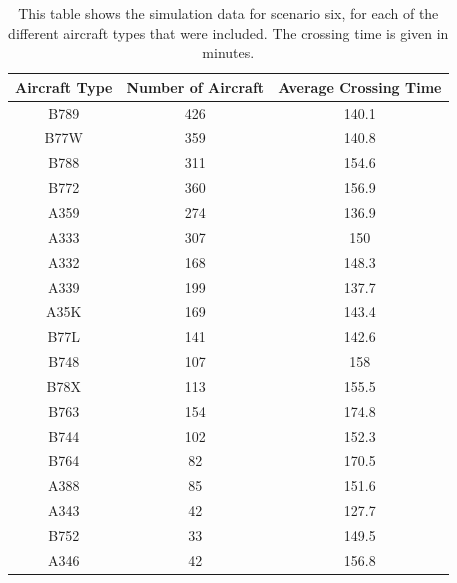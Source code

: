 \documentclass[stu, a4paper, 12pt, floatsintext]{apa7}
\numberwithin{figure}{section}
\numberwithin{table}{section}
\numberwithin{equation}{section}
\begin{document}
\begin{table}[H]
    \centering
    \caption{This table shows the simulation data for scenario six, for each of the different aircraft types that were included. The crossing time is given in minutes.}
    \label{tab:37}
    \begin{tabular}{@{}ccc@{}}
    \toprule
    \textbf{Aircraft Type} & \textbf{Number of Aircraft} & \textbf{Average Crossing Time} \\ \midrule
    B789                   & 426                         & 140.1                          \\
    B77W                   & 359                         & 140.8                          \\
    B788                   & 311                         & 154.6                          \\
    B772                   & 360                         & 156.9                          \\
    A359                   & 274                         & 136.9                          \\
    A333                   & 307                         & 150                            \\
    A332                   & 168                         & 148.3                          \\
    A339                   & 199                         & 137.7                          \\
    A35K                   & 169                         & 143.4                          \\
    B77L                   & 141                         & 142.6                          \\
    B748                   & 107                         & 158                            \\
    B78X                   & 113                         & 155.5                          \\
    B763                   & 154                         & 174.8                          \\
    B744                   & 102                         & 152.3                          \\
    B764                   & 82                          & 170.5                          \\
    A388                   & 85                          & 151.6                          \\
    A343                   & 42                          & 127.7                          \\
    B752                   & 33                          & 149.5                          \\
    A346                   & 42                          & 156.8                          \\ \bottomrule
    \end{tabular}
\end{table}
\end{document}
